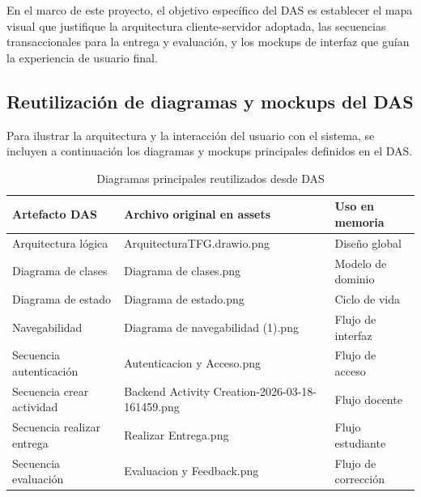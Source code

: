 En el marco de este proyecto, el objetivo espec\'ifico del DAS es establecer el mapa visual que justifique la arquitectura cliente-servidor adoptada, las secuencias transaccionales para la entrega y evaluaci\'on, y los mockups de interfaz que gu\'ian la experiencia de usuario final.

\subsection{Reutilizaci\'on de diagramas y mockups del DAS}

Para ilustrar la arquitectura y la interacci\'on del usuario con el sistema, se incluyen a continuaci\'on los diagramas y mockups principales definidos en el DAS.

\begin{table}[!htbp]
\centering
\small
\begin{tabular}{|P{3.5cm}|P{5.5cm}|P{2.8cm}|}
\hline
\textbf{Artefacto DAS} & \textbf{Archivo original en assets} & \textbf{Uso en memoria} \\
\hline
Arquitectura l\'ogica & ArquitecturaTFG.drawio.png & Dise\~no global \\
\hline
Diagrama de clases & Diagrama de clases.png & Modelo de dominio \\
\hline
Diagrama de estado & Diagrama de estado.png & Ciclo de vida \\
\hline
Navegabilidad & Diagrama de navegabilidad (1).png & Flujo de interfaz \\
\hline
Secuencia autenticaci\'on & Autenticacion y Acceso.png & Flujo de acceso \\
\hline
Secuencia crear actividad & Backend Activity Creation-2026-03-18-161459.png & Flujo docente \\
\hline
Secuencia realizar entrega & Realizar Entrega.png & Flujo estudiante \\
\hline
Secuencia evaluaci\'on & Evaluacion y Feedback.png & Flujo de correcci\'on \\
\hline
\end{tabular}
\normalsize
\caption{Diagramas principales reutilizados desde DAS}
\label{tab:das-diagramas-principales}
\end{table}



